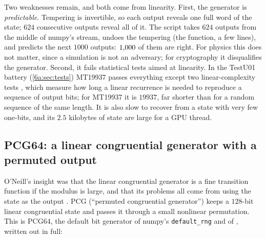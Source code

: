 Two weaknesses remain, and both come from linearity. First, the generator is
\emph{predictable}. Tempering is invertible, so each output reveals one full word
of the state; $624$ consecutive outputs reveal all of it. The script takes $624$
outputs from the middle of numpy's stream, undoes the tempering (the
 function, a few lines), and predicts the next $1000$ outputs:
$1{,}000$ of them are right. For physics this does not matter, since a
simulation is not an adversary; for cryptography it disqualifies the generator.
Second, it fails statistical tests aimed at linearity. In the TestU01 battery
(\cref{6a:sec:tests}) MT19937 passes everything except two linear-complexity tests
\cite{LEcuyerSimard2007}, which measure how long a linear recurrence is needed to
reproduce a sequence of output bits; for MT19937 it is $19937$, far shorter than
for a random sequence of the same length. It is also slow to recover from a state
with very few one-bits, and its $2.5$ kilobytes of state are large for a GPU thread.

\subsection{PCG64: a linear congruential generator with a permuted output}

O'Neill's insight was that the linear congruential generator is a fine transition
function if the modulus is large, and that its problems all come from using the
state as the output \cite{ONeill2014}. PCG (``permuted congruential generator'')
keeps a $128$-bit linear congruential state and passes it through a small
nonlinear permutation. This is PCG64, the default bit generator of numpy's
\texttt{default\_rng} and of , written out in full:


